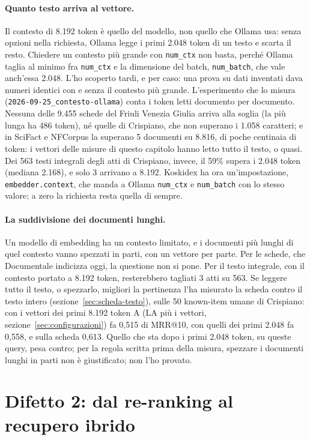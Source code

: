 \paragraph{Quanto testo arriva al vettore.} Il contesto di 8.192 token è quello
del modello, non quello che Ollama usa: senza opzioni nella richiesta, Ollama
legge i primi 2.048 token di un testo e scarta il resto. Chiedere un contesto più
grande con \texttt{num\_ctx} non basta, perché Ollama taglia al minimo fra
\texttt{num\_ctx} e la dimensione del batch, \texttt{num\_batch}, che vale anch'essa
2.048. L'ho scoperto tardi, e per caso: una prova su dati inventati dava numeri
identici con e senza il contesto più grande. L'esperimento che lo misura
(\texttt{2026-09-25\_contesto-ollama}) conta i token letti documento per
documento. Nessuna delle 9.455 schede del Friuli Venezia Giulia arriva alla
soglia (la più lunga ha 486 token), né quelle di Crispiano, che non superano i
1.058 caratteri; e in
SciFact e NFCorpus la superano 5 documenti su 8.816, di poche centinaia di token:
i vettori delle misure di questo capitolo hanno letto tutto il testo, o quasi. Dei 563 testi integrali
degli atti di Crispiano, invece, il 59\% supera i 2.048 token (mediana 2.168), e
solo 3 arrivano a 8.192. Koskidex ha ora un'impostazione, \texttt{embedder.context},
che manda a Ollama \texttt{num\_ctx} e \texttt{num\_batch} con lo stesso valore;
a zero la richiesta resta quella di sempre.

\paragraph{La suddivisione dei documenti lunghi.} Un modello di embedding ha un
contesto limitato, e i documenti più lunghi di quel contesto vanno spezzati in
parti, con un vettore per parte. Per le schede, che Documentale indicizza oggi,
la questione non si pone. Per il testo integrale, con il contesto portato a 8.192
token, resterebbero tagliati 3 atti su 563. Se leggere tutto il testo, o
spezzarlo, migliori la pertinenza l'ha misurato la scheda contro il testo
intero (sezione~\ref{sec:scheda-testo}), sulle 50 known-item umane di
Crispiano: con i vettori dei primi 8.192 token A (LA più i vettori, sezione~\ref{sec:configurazioni}) fa 0,515 di MRR@10, con quelli
dei primi 2.048 fa 0,558, e sulla scheda 0,613. Quello che sta dopo i primi
2.048 token, su queste query, pesa contro; per la regola scritta prima della
misura, spezzare i documenti lunghi in parti non è giustificato; non l'ho provato.

\section{Difetto 2: dal re-ranking al recupero ibrido}\label{sec:difetto2}

